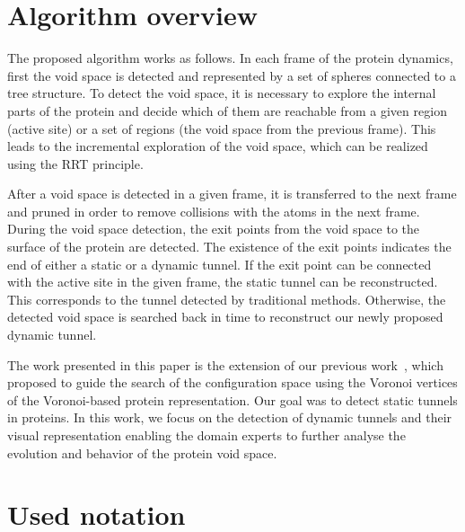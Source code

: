 \documentclass[usletter, 10pt, conference]{svjour3}      %
\begin{document}
\section{Algorithm overview}

The proposed algorithm works as follows.
In each frame of the protein dynamics, first the void space is detected and represented by a set of spheres connected to a tree structure.
To detect the void space, it is necessary to explore the internal parts of the protein and decide which of them are reachable from a given
region (active site) or a set of regions (the void space from the previous frame).
This leads to the incremental exploration of the void space, which can be realized using the RRT principle.

After a void space is detected in a given frame, it is transferred to the next frame and pruned in order to remove collisions with the atoms in the next frame.
During the void space detection, the exit points from the void space to the surface of the protein are detected.
The existence of the exit points indicates the end of either a static or a dynamic tunnel.
If the exit point can be connected with the active site in the given frame, the static tunnel can be reconstructed.
This corresponds to the tunnel detected by traditional methods.
Otherwise, the detected void space is searched back in time to reconstruct our newly proposed dynamic tunnel.

The work presented in this paper is the extension of our previous work~\cite{vonasek2017tunnel}, which proposed to guide the search
of the configuration space using the Voronoi vertices of the Voronoi-based protein representation.
Our goal was to detect static tunnels in proteins.
In this work, we focus on the detection of dynamic tunnels and their visual representation enabling the domain experts to further analyse the evolution and behavior of the protein void space.

\section{Used notation}
\end{document}
